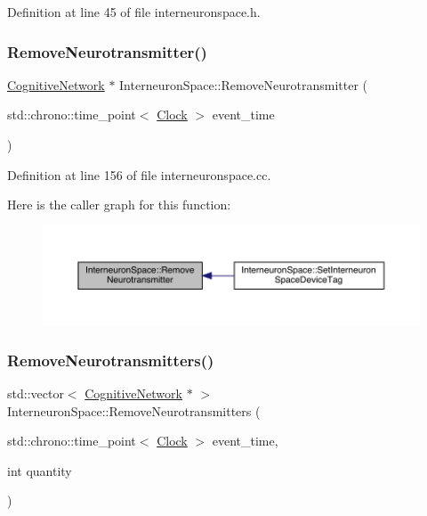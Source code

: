 Definition at line 45 of file interneuronspace.\+h.

\mbox{\label{class_interneuron_space_aa46b5ce238b49425a68fcfd53ba1d8b7}} 
\subsubsection{\texorpdfstring{Remove\+Neurotransmitter()}{RemoveNeurotransmitter()}}
{\footnotesize\ttfamily \hyperlink{class_cognitive_network}{Cognitive\+Network} $\ast$ Interneuron\+Space\+::\+Remove\+Neurotransmitter (\begin{DoxyParamCaption}\item[{std\+::chrono\+::time\+\_\+point$<$ \hyperlink{universe_8h_a0ef8d951d1ca5ab3cfaf7ab4c7a6fd80}{Clock} $>$}]{event\+\_\+time }\end{DoxyParamCaption})}



Definition at line 156 of file interneuronspace.\+cc.

Here is the caller graph for this function\+:\nopagebreak
\begin{figure}[H]
\begin{center}
\leavevmode
\includegraphics[width=350pt]{class_interneuron_space_aa46b5ce238b49425a68fcfd53ba1d8b7_icgraph}
\end{center}
\end{figure}
\mbox{\label{class_interneuron_space_a7b11f542ab7a3d293d5fcf5a1b522ac2}} 
\subsubsection{\texorpdfstring{Remove\+Neurotransmitters()}{RemoveNeurotransmitters()}}
{\footnotesize\ttfamily std\+::vector$<$ \hyperlink{class_cognitive_network}{Cognitive\+Network} $\ast$ $>$ Interneuron\+Space\+::\+Remove\+Neurotransmitters (\begin{DoxyParamCaption}\item[{std\+::chrono\+::time\+\_\+point$<$ \hyperlink{universe_8h_a0ef8d951d1ca5ab3cfaf7ab4c7a6fd80}{Clock} $>$}]{event\+\_\+time,  }\item[{int}]{quantity }\end{DoxyParamCaption})}



